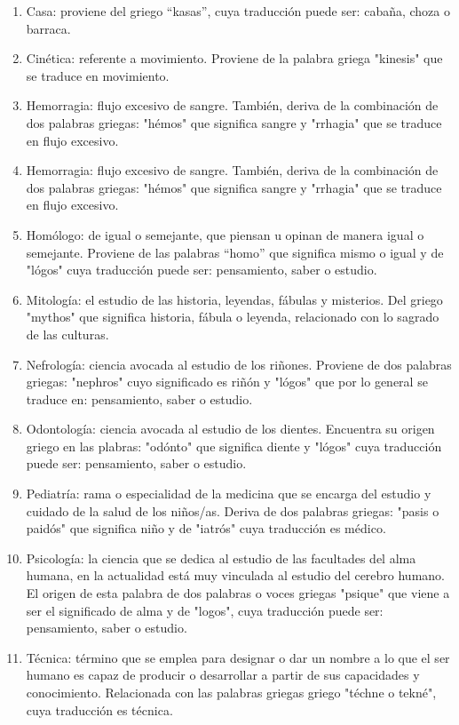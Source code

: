 \documentclass{mylib/reporte}
\begin{document}
\begin{enumerate}
	\item Casa: proviene del griego “kasas”, cuya traducción puede ser: cabaña, choza o barraca.
	\item Cinética: referente a movimiento. Proviene de la palabra griega "kinesis" que se traduce en movimiento.
	\item Hemorragia: flujo excesivo de sangre. También, deriva de la combinación de dos palabras griegas: "hémos" que significa sangre y "rrhagia" que se traduce en flujo excesivo.
	\item Hemorragia: flujo excesivo de sangre. También, deriva de la combinación de dos palabras griegas: "hémos" que significa sangre y "rrhagia" que se traduce en flujo excesivo.
	\item Homólogo: de igual o semejante, que piensan u opinan de manera igual o semejante. Proviene de las palabras “homo” que significa mismo o igual y de "lógos" cuya traducción puede ser: pensamiento, saber o estudio.
	\item Mitología: el estudio de las historia, leyendas, fábulas y misterios. Del griego "mythos" que significa historia, fábula o leyenda, relacionado con lo sagrado de las culturas.
	\item Nefrología: ciencia avocada al estudio de los riñones. Proviene de dos palabras griegas: "nephros" cuyo significado es riñón y "lógos" que por lo general se traduce en: pensamiento, saber o estudio.
	\item Odontología: ciencia avocada al estudio de los dientes. Encuentra su origen griego en las plabras: "odónto" que significa diente y "lógos" cuya traducción puede ser: pensamiento, saber o estudio.
	\item Pediatría: rama o especialidad de la medicina que se encarga del estudio y cuidado de la salud de los niños/as. Deriva de dos palabras griegas: "pasis o paidós" que significa niño y de "iatrós" cuya traducción es médico.
	\item Psicología: la ciencia que se dedica al estudio de las facultades del alma humana, en la actualidad está muy vinculada al estudio del cerebro humano. El origen de esta palabra de dos palabras o voces griegas "psique" que viene a ser el significado de alma y de "logos", cuya traducción puede ser: pensamiento, saber o estudio.
	\item Técnica: término que se emplea para designar o dar un nombre a lo que el ser humano es capaz de producir o desarrollar a partir de sus capacidades y conocimiento. Relacionada con las palabras griegas griego "téchne o tekné", cuya traducción es técnica.

\end{enumerate}
\end{document}
